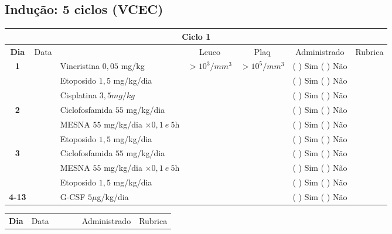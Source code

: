 \documentclass[11pt,a4paper,oldfontcommands]{memoir}
\begin{document}
\subsection{Indução: 5 ciclos (VCEC)}
\begin{center}
\begin{table}[H] \small
\begin{tabular}{p{1cm}c|p{4.8cm}|p{1.5cm}p{1.5cm}|c|c}
	\hline
	\multicolumn{7}{c}{Ciclo 1} \\
	\hline
	\multicolumn{1}{c|}{\multirow{1}{*}{\textbf{Dia}}}&{Data}&{}&\multicolumn{1}{c|}{Leuco}&\multicolumn{1}{c|}{Plaq}&{Administrado}&{Rubrica} \\
    \hline
    \multicolumn{1}{c|}{\multirow{3}{*}{\textbf{1}}}&&{Vincristina \(0,05\) mg/kg}&\multicolumn{1}{c|}{\(>10^3/mm^3\)}&\multicolumn{1}{c|}{\(>10^5/mm^3\)}&{(  ) Sim (  ) Não}&\\
    \cline{4-5}
    \multicolumn{1}{c|}{}&&{Etoposido \(1,5\) mg/kg/dia}&\multicolumn{1}{c|}{}&&{(  ) Sim (  ) Não}&\\
    \cline{4-5}
    \multicolumn{1}{c|}{}&\multirow{1}{*}{}&{Cisplatina \(3,5mg/kg\)}&&&{(  ) Sim (  ) Não}&\\
    \hline
    \multicolumn{1}{c|}{\multirow{3}{*}{\textbf{2}}}&&{Ciclofosfamida \(55\) mg/kg/dia}&{}&&{(  ) Sim (  ) Não}&\\
    \multicolumn{1}{c|}{}&&{MESNA \(55\) mg/kg/dia \(\times 0,1 \:e\: 5\)h}&&&{(  ) Sim (  ) Não}&\\
    \multicolumn{1}{c|}{}&&{Etoposido \(1,5\) mg/kg/dia}&&&{(  ) Sim (  ) Não}&\\
    \hline
    \multicolumn{1}{c|}{\multirow{3}{*}{\textbf{3}}}&&{Ciclofosfamida \(55\) mg/kg/dia}&{}&&{(  ) Sim (  ) Não}&\\
    \multicolumn{1}{c|}{}&&{MESNA \(55\) mg/kg/dia \(\times 0,1 \:e\: 5\)h}&&&{(  ) Sim (  ) Não}&\\
    \multicolumn{1}{c|}{}&\multirow{1}{*}{}&{Etoposido \(1,5\) mg/kg/dia}&{}&&{(  ) Sim (  ) Não}&\\
    \hline
    \multicolumn{1}{c|}{\textbf{4-13}}&&{G-CSF \(5 \mu\)g/kg/dia }&&&{(  ) Sim (  ) Não}&\\
    \hline
\end{tabular}
\end{table}
\begin{table}[H] \small
\begin{tabular}{p{1cm}c|p{4.8cm}|p{1.9cm}p{1.9cm}|c|c}
	\hline
	\multicolumn{1}{c|}{\multirow{1}{*}{\textbf{Dia}}}&{Data}&{}&{}&&{Administrado}&{Rubrica} \\

\end{tabular}
\end{table}
\end{center}
\end{document}
